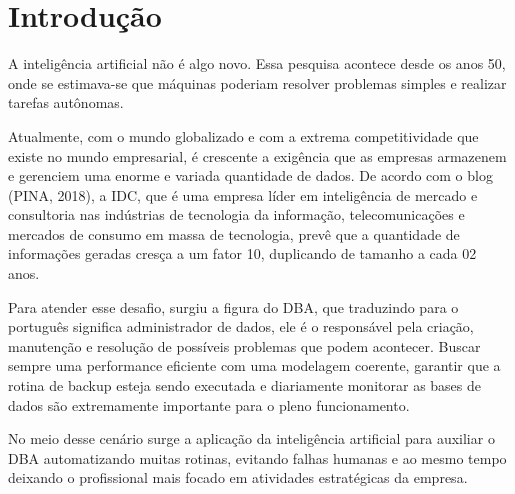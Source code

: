 \chapter{Introdução}

A inteligência artificial não é algo novo. Essa pesquisa acontece desde os anos 50, onde se estimava-se que máquinas poderiam resolver problemas simples e realizar tarefas autônomas.


Atualmente, com o mundo globalizado e com a extrema competitividade que existe no mundo empresarial, é crescente a exigência que as empresas armazenem e gerenciem uma enorme e variada quantidade de dados. De acordo com o blog (PINA, 2018), a IDC, que é uma empresa líder em inteligência de mercado e consultoria nas indústrias de tecnologia da informação, telecomunicações e mercados de consumo em massa de tecnologia, prevê que a quantidade de informações geradas cresça a um fator 10, duplicando de tamanho a cada 02 anos.


Para atender esse desafio, surgiu a figura do DBA, que traduzindo para o português significa administrador de dados, ele é o responsável pela criação, manutenção e resolução de possíveis problemas que podem acontecer. Buscar sempre uma performance eficiente com uma modelagem coerente, garantir que a rotina de backup esteja sendo executada e diariamente monitorar as bases de dados são extremamente importante para o pleno funcionamento.

No meio desse cenário surge a aplicação da inteligência artificial para auxiliar o DBA automatizando muitas rotinas, evitando falhas humanas e ao mesmo tempo deixando o profissional mais focado em atividades estratégicas da empresa.